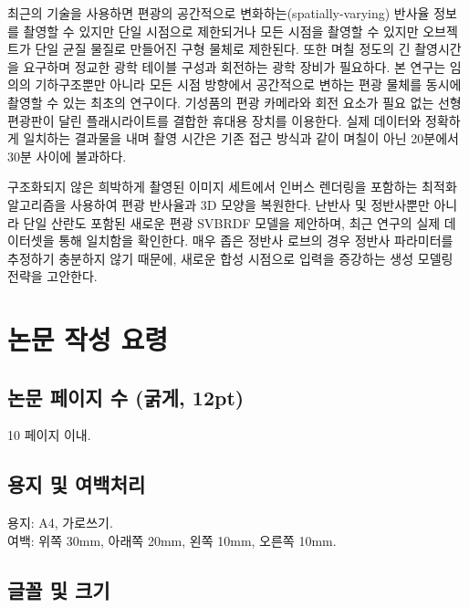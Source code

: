 \documentclass[a4paper,twocolumn]{article}
\begin{document}
최근의 기술을 사용하면 편광의 공간적으로 변화하는(spatially-varying) 반사율 정보를 촬영할 수 있지만 단일 시점으로 제한되거나 모든 시점을 촬영할 수 있지만 오브젝트가 단일 균질 물질로 만들어진 구형 물체로 제한된다.
또한 며칠 정도의 긴 촬영시간을 요구하며 정교한 광학 테이블 구성과 회전하는 광학 장비가 필요하다.
본 연구는 임의의 기하구조뿐만 아니라 모든 시점 방향에서 공간적으로 변하는 편광 물체를 동시에 촬영할 수 있는 최초의 연구이다. 기성품의 편광 카메라와 회전 요소가 필요 없는 선형 편광판이 달린 플래시라이트를 결합한 휴대용 장치를 이용한다. 
실제 데이터와 정확하게 일치하는 결과물을 내며 촬영 시간은 기존 접근 방식과 같이 며칠이 아닌 20분에서 30분 사이에 불과하다.

구조화되지 않은 희박하게 촬영된 이미지 세트에서 인버스 렌더링을 포함하는 최적화 알고리즘을 사용하여 편광 반사율과 3D 모양을 복원한다. 
난반사 및 정반사뿐만 아니라 단일 산란도 포함된 새로운 편광 SVBRDF 모델을 제안하며, 최근 연구의 실제 데이터셋을 통해 일치함을 확인한다.
매우 좁은 정반사 로브의 경우 정반사 파라미터를 추정하기 충분하지 않기 때문에, 새로운 합성 시점으로 입력을 증강하는 생성 모델링 전략을 고안한다.

\section{논문 작성 요령}
\label{sec:paper_writing_technique}


\subsection{논문 페이지 수 (굵게, 12pt)}
\label{subsec:paper_page_num}

10 페이지 이내.


\subsection{용지 및 여백처리}
\label{subsec:paper_and_margin}

용지: A4, 가로쓰기. \\
여백: 위쪽 30mm, 아래쪽 20mm, 왼쪽 10mm, 오른쪽 10mm.


\subsection{글꼴 및 크기}
\label{subsec:paper_font}
\end{document}
